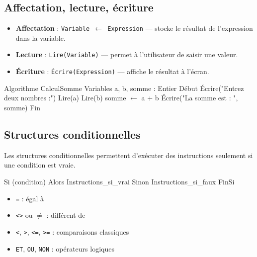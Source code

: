 \subsection{Affectation, lecture, écriture}

\begin{aretenir}
\begin{itemize}
    \item \textbf{Affectation} : \texttt{Variable $\leftarrow$ Expression} — stocke le résultat de l'expression dans la variable.
    \item \textbf{Lecture} : \texttt{Lire(Variable)} — permet à l'utilisateur de saisir une valeur.
    \item \textbf{Écriture} : \texttt{Écrire(Expression)} — affiche le résultat à l'écran.
\end{itemize}
\end{aretenir}

\begin{exemple}
\begin{algo}
Algorithme CalculSomme
Variables
    a, b, somme : Entier
Début
    Écrire("Entrez deux nombres :")
    Lire(a)
    Lire(b)
    somme $\leftarrow$ a + b
    Écrire("La somme est : ", somme)
Fin
\end{algo}
\end{exemple}

\subsection{Structures conditionnelles}
Les structures conditionnelles permettent d'exécuter des instructions seulement si une condition est vraie.

\begin{definition}
\begin{algo}
Si (condition) Alors
    Instructions_si_vrai
Sinon
    Instructions_si_faux
FinSi
\end{algo}
\end{definition}

\begin{aretenir}
\begin{itemize}
    \item \texttt{=} : égal à
    \item \texttt{<>} ou \texttt{$\neq$} : différent de
    \item \texttt{<}, \texttt{>}, \texttt{<=}, \texttt{>=} : comparaisons classiques
    \item \texttt{ET}, \texttt{OU}, \texttt{NON} : opérateurs logiques
\end{itemize}
\end{aretenir}


